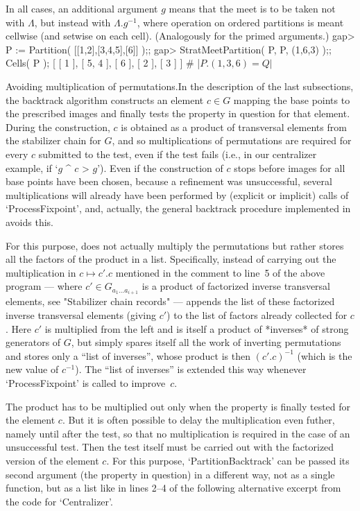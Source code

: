 In  all cases, an additional  argument $g$ means that the   meet is to be
taken  not with $\Lambda$,   but  instead with $\Lambda.{g^{-1}}$,  where
operation  on ordered partitions is  meant cellwise  (and setwise on each
cell). (Analogously for the primed arguments.)
\beginexample
    gap> P := Partition( [[1,2],[3,4,5],[6]] );;
    gap> StratMeetPartition( P, P, (1,6,3) );;  Cells( P );
    [ [ 1 ], [ 5, 4 ], [ 6 ], [ 2 ], [ 3 ] ]  # |$P.(1,3,6) = Q|$
\endexample

\medskip%
{\bsf Avoiding multiplication  of permutations.}\quad In the  description
of  the last subsections, the  backtrack  algorithm constructs an element
$c\in G$ mapping  the base points   to the prescribed images  and finally
tests the property in question for that element. During the construction,
$c$ is obtained as a product  of transversal elements from the stabilizer
chain for $G$,  and so multiplications  of permutations are required  for
every $c$  submitted to the test,  even if the  test fails (i.e.,  in our
centralizer example, if `$g$ ^ $c$ \<> $g$'). Even if the construction of
$c$ stops before images  for all base  points have been chosen, because a
refinement was unsuccessful,  several  multiplications will  already have
been performed by (explicit or implicit) calls of `ProcessFixpoint', and,
actually, the general   backtrack procedure implemented in  {\GAP} avoids
this.

For this purpose, {\GAP} does  not actually multiply the permutations but
rather stores  all the factors of the   product in a  list. Specifically,
instead of carrying out  the multiplication in $c\mapsto c'.c$  mentioned
in  the   comment  to  line~5 of  the   above  program   --- where $c'\in
G_{a_1\ldots  a_{i+1}}$ is a  product  of factorized inverse  transversal
elements, see "Stabilizer  chain records" ---  {\GAP} appends the list of
these factorized inverse  transversal elements (giving  $c'$) to the list
of factors already  collected for $c$. Here $c'$  is multiplied from  the
left and is itself a  product of *inverses*  of strong generators of $G$,
but {\GAP} simply spares itself   all the work of inverting  permutations
and stores  only  a    ``list  of  inverses'',  whose product    is  then
$(c'.c)^{-1}$  (which is  the  new  value of  $c^{-1}$).  The ``list   of
inverses'' is  extended this way  whenever `ProcessFixpoint' is called to
improve~$c$.

The  product has to be multiplied  out only when  the property is finally
tested  for  the  element $c$. But  it  is  often possible  to  delay the
multiplication  even  futher, namely  until after   the test, so  that no
multiplication is required in the case of  an unsuccessful test. Then the
test  itself  must be carried   out with the  factorized   version of the
element $c$.  For  this purpose,  `PartitionBacktrack' can  be passed its
second argument (the property  in question) in  a different way, not as a
single {\GAP} function, but as a list like in lines 2--4 of the following
alternative excerpt from the code for `Centralizer'.

